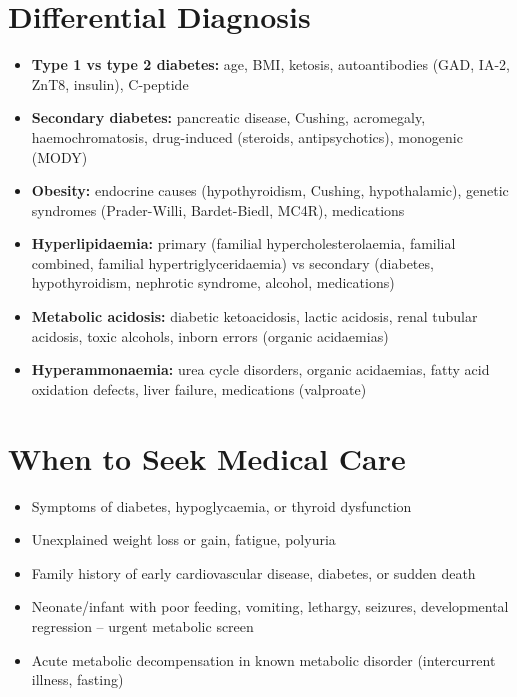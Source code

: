 \section*{Differential Diagnosis}
\begin{itemize}
    \item \textbf{Type 1 vs type 2 diabetes:} age, BMI, ketosis, autoantibodies (GAD, IA-2, ZnT8, insulin), C-peptide
    \item \textbf{Secondary diabetes:} pancreatic disease, Cushing, acromegaly, haemochromatosis, drug-induced (steroids, antipsychotics), monogenic (MODY)
    \item \textbf{Obesity:} endocrine causes (hypothyroidism, Cushing, hypothalamic), genetic syndromes (Prader-Willi, Bardet-Biedl, MC4R), medications
    \item \textbf{Hyperlipidaemia:} primary (familial hypercholesterolaemia, familial combined, familial hypertriglyceridaemia) vs secondary (diabetes, hypothyroidism, nephrotic syndrome, alcohol, medications)
    \item \textbf{Metabolic acidosis:} diabetic ketoacidosis, lactic acidosis, renal tubular acidosis, toxic alcohols, inborn errors (organic acidaemias)
    \item \textbf{Hyperammonaemia:} urea cycle disorders, organic acidaemias, fatty acid oxidation defects, liver failure, medications (valproate)
\end{itemize}

\section*{When to Seek Medical Care}
\begin{itemize}
    \item Symptoms of diabetes, hypoglycaemia, or thyroid dysfunction
    \item Unexplained weight loss or gain, fatigue, polyuria
    \item Family history of early cardiovascular disease, diabetes, or sudden death
    \item Neonate/infant with poor feeding, vomiting, lethargy, seizures, developmental regression -- urgent metabolic screen
    \item Acute metabolic decompensation in known metabolic disorder (intercurrent illness, fasting)
\end{itemize}

